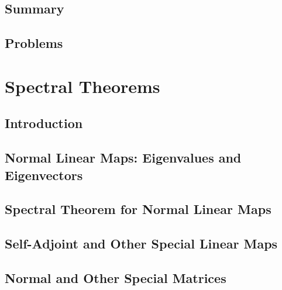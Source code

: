 \documentclass[a4paper]{article}
\begin{document}
\subsection{ Summary} %

\subsection{ Problems} %


\newpage
\section{Spectral Theorems}
\subsection{ Introduction} %

\subsection{ Normal Linear Maps: Eigenvalues and Eigenvectors} %

\subsection{ Spectral Theorem for Normal Linear Maps} %

\subsection{ Self-Adjoint and Other Special Linear Maps} %

\subsection{ Normal and Other Special Matrices} %
\end{document}
